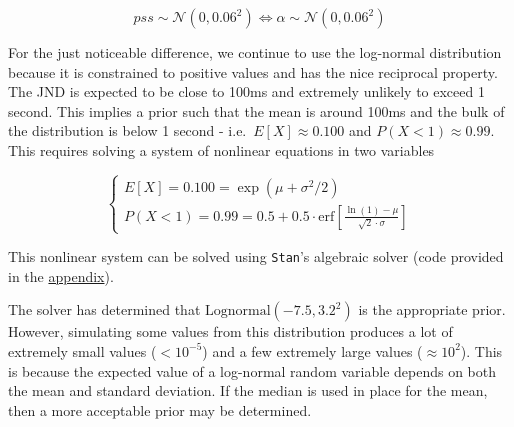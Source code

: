 \documentclass[11pt, oneside, openany]{scrbook}
\newenvironment{Shaded}{\begin{snugshade}}{\end{snugshade}}
\newcommand{\CommentTok}[1]{\textcolor[rgb]{0.56,0.35,0.01}{\textit{#1}}}
\newcommand{\DataTypeTok}[1]{\textcolor[rgb]{0.13,0.29,0.53}{#1}}
\newcommand{\DecValTok}[1]{\textcolor[rgb]{0.00,0.00,0.81}{#1}}
\newcommand{\KeywordTok}[1]{\textcolor[rgb]{0.13,0.29,0.53}{\textbf{#1}}}
\newcommand{\NormalTok}[1]{#1}
\newcommand{\OperatorTok}[1]{\textcolor[rgb]{0.81,0.36,0.00}{\textbf{#1}}}
\newcommand{\StringTok}[1]{\textcolor[rgb]{0.31,0.60,0.02}{#1}}
\begin{document}
\[
pss \sim \mathcal{N}(0, 0.06^2) \Longleftrightarrow \alpha \sim \mathcal{N}(0, 0.06^2)
\]

For the just noticeable difference, we continue to use the log-normal distribution because it is constrained to positive values and has the nice reciprocal property. The JND is expected to be close to 100ms and extremely unlikely to exceed 1 second. This implies a prior such that the mean is around 100ms and the bulk of the distribution is below 1 second - i.e.~\(E[X] \approx 0.100\) and \(P(X < 1) \approx 0.99\). This requires solving a system of nonlinear equations in two variables

\[
\begin{cases}
E[X] = 0.100 = \exp\left(\mu + \sigma^2 / 2\right) \\
P(X < 1) = 0.99 = 0.5 + 0.5 \cdot \mathrm{erf}\left[\frac{\ln (1) - \mu}{\sqrt{2} \cdot \sigma}\right]
\end{cases}
\]

This nonlinear system can be solved using \texttt{Stan}'s algebraic solver (code provided in the \protect\hyperlink{code}{appendix}).

\begin{Shaded}
\end{Shaded}

The solver has determined that \(\mathrm{Lognormal}(-7.5, 3.2^2)\) is the appropriate prior. However, simulating some values from this distribution produces a lot of extremely small values (\(<10^{-5}\)) and a few extremely large values (\(\approx 10^2\)). This is because the expected value of a log-normal random variable depends on both the mean and standard deviation. If the median is used in place for the mean, then a more acceptable prior may be determined.
\end{document}
